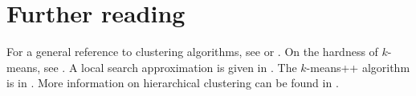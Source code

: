 \section{Further reading}
For a general reference to clustering algorithms, see \cite{har75}
or \cite{gon85}. On the hardness of $k$-means, see \cite{das2008}.
A local search approximation is given in \cite{kan2004}. The 
$k$-means++ algorithm is in \cite{art2007}. More information on hierarchical
clustering can be found in \cite{das2016}.

